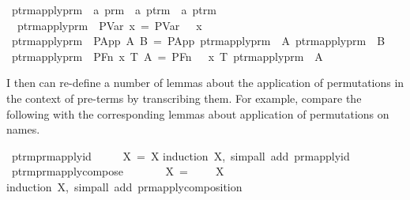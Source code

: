 \begin{implementation}
\isamarkupfalse%
\ ptrm{\isacharunderscore}apply{\isacharunderscore}prm\ {\isacharcolon}{\isacharcolon}\ {\isachardoublequoteopen}{\isacharprime}a\ prm\ {\isasymRightarrow}\ {\isacharprime}a\ ptrm\ {\isasymRightarrow}\ {\isacharprime}a\ ptrm{\isachardoublequoteclose}\ {\isacharparenleft}\ {\isachardoublequoteopen}{\isasymbullet}{\isachardoublequoteclose}\ {}{}{}{\isacharparenright}\ \isanewline
\ \ {\isachardoublequoteopen}ptrm{\isacharunderscore}apply{\isacharunderscore}prm\ {\isasympi}\ {\isacharparenleft}PVar\ x{\isacharparenright}\ =\ PVar\ {\isacharparenleft}{\isasympi}\ {\isachardollar}\ x{\isacharparenright}{\isachardoublequoteclose}\isanewline
{\isacharbar}\ {\isachardoublequoteopen}ptrm{\isacharunderscore}apply{\isacharunderscore}prm\ {\isasympi}\ {\isacharparenleft}PApp\ A\ B{\isacharparenright}\ =\ PApp\ {\isacharparenleft}ptrm{\isacharunderscore}apply{\isacharunderscore}prm\ {\isasympi}\ A{\isacharparenright}\ {\isacharparenleft}ptrm{\isacharunderscore}apply{\isacharunderscore}prm\ {\isasympi}\ B{\isacharparenright}{\isachardoublequoteclose}\isanewline
{\isacharbar}\ {\isachardoublequoteopen}ptrm{\isacharunderscore}apply{\isacharunderscore}prm\ {\isasympi}\ {\isacharparenleft}PFn\ x\ T\ A{\isacharparenright}\ =\ PFn\ {\isacharparenleft}{\isasympi}\ {\isachardollar}\ x{\isacharparenright}\ T\ {\isacharparenleft}ptrm{\isacharunderscore}apply{\isacharunderscore}prm\ {\isasympi}\ A{\isacharparenright}{\isachardoublequoteclose}\isanewline
\end{implementation}

I then can re-define a number of lemmas about the application of permutations in the context of pre-terms by transcribing them.
For example, compare the following with the corresponding lemmas about application of permutations on names.

\begin{implementation}
\isamarkupfalse%
\ ptrm{\isacharunderscore}prm{\isacharunderscore}apply{\isacharunderscore}id{\isacharcolon}\isanewline
\ \ \ {\isachardoublequoteopen}{\isasymepsilon}\ {\isasymbullet}\ X\ =\ X{\isachardoublequoteclose}\isanewline
\isatagproof
{}\isamarkupfalse%
{\isacharparenleft}induction\ X,\ simp{\isacharunderscore}all\ add{\isacharcolon}\ prm{\isacharunderscore}apply{\isacharunderscore}id{\isacharparenright}%
\endisatagproof
\isanewline
\isanewline
{}\isamarkupfalse%
\ ptrm{\isacharunderscore}prm{\isacharunderscore}apply{\isacharunderscore}compose{\isacharcolon}\isanewline
\ \ \ {\isachardoublequoteopen}{\isasympi}\ {\isasymbullet}\ {\isasymsigma}\ {\isasymbullet}\ X\ =\ {\isacharparenleft}{\isasympi}\ {\isasymdiamondop}\ {\isasymsigma}{\isacharparenright}\ {\isasymbullet}\ X{\isachardoublequoteclose}\isanewline
\isatagproof
{}\isamarkupfalse%
{\isacharparenleft}induction\ X,\ simp{\isacharunderscore}all\ add{\isacharcolon}\ prm{\isacharunderscore}apply{\isacharunderscore}composition{\isacharparenright}%
\endisatagproof
\end{implementation}

